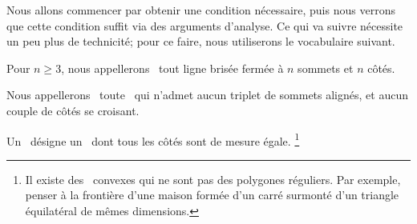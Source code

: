 Nous allons commencer par obtenir une condition nécessaire, puis nous verrons que cette condition suffit via des arguments d'analyse.
Ce qui va suivre nécessite un peu plus de technicité; pour ce faire, nous utiliserons le vocabulaire suivant.




\begin{defi}
	Pour $n \geq 3$, nous appellerons \og \emph{\nline} \fg\ tout ligne brisée fermée à $n$ sommets et $n$ côtés.
\end{defi}


\begin{defi}
	Nous appellerons \og \emph{\ngone} \fg\ toute \nline\ qui n'admet aucun triplet de sommets alignés, et aucun couple de côtés se croisant.
\end{defi}


\begin{defi}
	Un \og \emph{\niso} \fg\ désigne un \ngone\ dont tous les côtés sont de mesure égale.%
	\footnote{
		Il existe des \nisos\ convexes qui ne sont pas des polygones réguliers. Par exemple, penser à la frontière d'une maison formée d'un carré surmonté d'un triangle équilatéral de mêmes dimensions.
	}
\end{defi}
